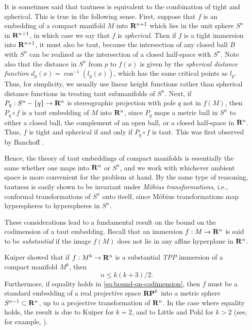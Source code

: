 \documentclass[12pt]{article}
\begin{document}
It is sometimes said that tautness is equivalent to the
combination of tight and spherical.  This is true in the following
sense.  First, suppose that $f$ is an embedding of a compact
manifold $M$ into ${\bf R}^{n+1}$ which lies in the unit
sphere $S^n$ in  ${\bf R}^{n+1}$, in which case we say that
$f$ is {\em spherical}.  Then if $f$ is a tight immersion into
${\bf R}^{n+1}$, it must also be taut, because the intersection
of any closed ball $B$ with $S^n$ can be realized as the
intersection of a closed half-space with $S^n$.
Note also that the distance in $S^n$ from $p$ to $f(x)$ is given
by the {\em spherical distance function} 
$d_p(x) = \cos^{-1} (l_p(x))$, which has the same critical points
as $l_p$.  Thus, for simplicity, we usually use linear height functions
rather than spherical distance functions in treating taut
submanifolds of $S^n$.
Next, if
$P_q:S^n - \{q\} \rightarrow {\bf R}^n$ is stereographic
projection with pole $q$ not in $f(M)$, then $P_q \circ f$
is a taut embedding of $M$ into  ${\bf R}^n$, since $P_q$ maps
a metric ball in $S^n$ to either a closed ball, the complement
of an open ball, or a closed half-space in  ${\bf R}^n$.  Thus,
$f$ is tight and spherical if and only if $P_q \circ f$
is taut. This was first observed by Banchoff \cite{Ban1}.

Hence, the theory of taut embeddings of compact 
manifolds is essentially the same whether one maps  into
${\bf R}^n$ or $S^n$, and we work with whichever ambient space
is more convenient for the problem at hand.
By the same type of reasoning, tautness is easily shown
to be invariant under {\em M\"{o}bius transformations}, i.e.,
conformal transformations of $S^n$ onto itself, since M\"{o}bius
transformations map hyperspheres to hyperspheres in $S^n$.

These considerations lead to a fundamental result on the bound
on the codimension of a taut embedding.  Recall that an
immersion $f:M \rightarrow {\bf R}^n$ is said to be
{\em substantial} if the image $f(M)$ does not lie in
any affine hyperplane in ${\bf R}^n$. 

Kuiper \cite{Ku1} showed that if
$f:M^k \rightarrow {\bf R}^n$ is a substantial {\em TPP}
immersion of a 
compact manifold $M^k$, then 
\begin{equation}
\label{eq:bound-on-codimension}
n \leq k(k+3)/2.
\end{equation} 
Furthermore, if equality holds in \eqref{eq:bound-on-codimension},
then $f$ must be a standard embedding 
of a real projective
space ${\bf RP}^k$ into a metric sphere $S^{n-1} \subset  {\bf R}^n$, up to a projective transformation of ${\bf R}^n$.
In the case where equality holds, the result is due to Kuiper  \cite{Ku1} for $k=2$, and
to Little and Pohl \cite{LP} for $k>2$ (see, for example, \cite[pp. 98--108]{CR7}).  
\end{document}

